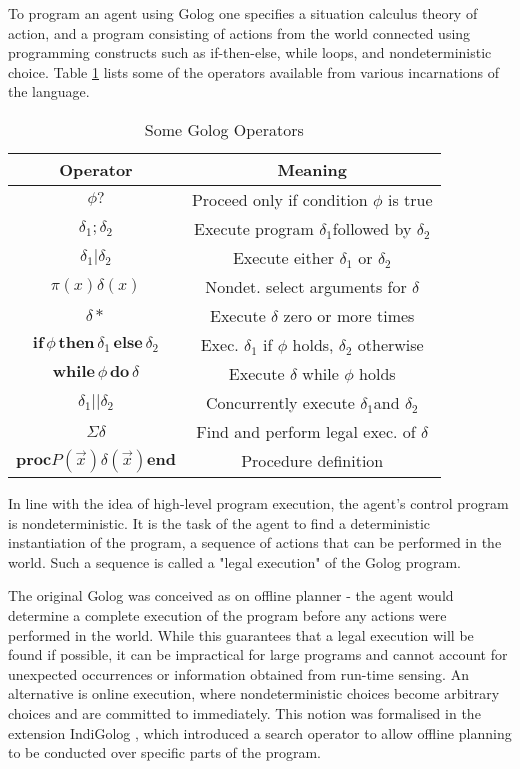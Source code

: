 \documentclass{llncs}
\begin{document}
To program an agent using Golog one specifies a situation calculus
theory of action, and a program consisting of actions from the world
connected using programming constructs such as if-then-else, while
loops, and nondeterministic choice. Table \ref{tbl:Golog-Operators}
lists some of the operators available from various incarnations of
the language.

\begin{table}[hbt]
\begin{center}\begin{tabular}{|c|c|}
\hline 
Operator&
Meaning\tabularnewline
\hline
\hline 
$\phi?$&
Proceed only if condition $\phi$ is true\tabularnewline
\hline 
$\delta_{1};\delta_{2}$&
Execute program $\delta_{1}$followed by $\delta_{2}$\tabularnewline
\hline 
$\delta_{1}|\delta_{2}$&
Execute either $\delta_{1}$ or $\delta_{2}$\tabularnewline
\hline 
$\pi(x)\delta(x)$&
Nondet. select arguments for $\delta$\tabularnewline
\hline 
$\delta*$&
Execute $\delta$ zero or more times\tabularnewline
\hline 
$\mathbf{if}\,\phi\,\mathbf{then}\,\delta_{1}\,\mathbf{else}\,\delta_{2}$&
Exec. $\delta_{1}$ if $\phi$ holds, $\delta_{2}$ otherwise\tabularnewline
\hline 
$\mathbf{while\,}\phi\mathbf{\, do}\,\delta$&
Execute $\delta$ while $\phi$ holds\tabularnewline
\hline 
$\delta_{1}||\delta_{2}$&
Concurrently execute $\delta_{1}$and $\delta_{2}$\tabularnewline
\hline 
$\Sigma\delta$&
Find and perform legal exec. of $\delta$\tabularnewline
\hline 
$\mathbf{proc}P(\overrightarrow{x})\delta(\overrightarrow{x})\mathbf{end}$&
Procedure definition\tabularnewline
\hline
\end{tabular}\end{center}


\caption{Some Golog Operators\label{tbl:Golog-Operators}}
\end{table}


In line with the idea of high-level program execution, the agent's
control program is nondeterministic. It is the task of the agent to
find a deterministic instantiation of the program, a sequence of actions
that can be performed in the world. Such a sequence is called a "legal
execution" of the Golog program.

The original Golog was conceived as on offline planner - the agent
would determine a complete execution of the program before any actions
were performed in the world. While this guarantees that a legal execution
will be found if possible, it can be impractical for large programs
and cannot account for unexpected occurrences or information obtained
from run-time sensing. An alternative is online execution, where nondeterministic
choices become arbitrary choices and are committed to immediately.
This notion was formalised in the extension IndiGolog \cite{giacomo99indigolog},
which introduced a search operator to allow offline planning to be
conducted over specific parts of the program.
\end{document}
